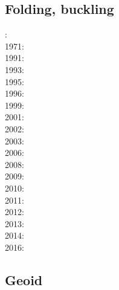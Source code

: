 \subsection{Folding, buckling} 

{\scriptsize
{}: \cite{ramb70}\\
1971: \cite{ramb71}\\
1991: \cite{flet91}\\
1993: \cite{zhhj93}\\
1995: \cite{flet95}\\
1996: \cite{zhho96}\\
1999: \cite{nagg99}\\
2001: \cite{scpo01}\\
2002: \cite{mumh02}\\
2003: \cite{nagv03}\\
2006: \cite{frsc06}\\
2008: \cite{schm08}\cite{manc08}\cite{scdk08}\\
2009: \cite{simp09}\\
2010: \cite{resb10}\\
2011: \cite{freh11}\\
2012: \cite{reds12}\cite{grsc12}\cite{scsc12}\\
2013: \cite{regc13}\\
2014: \cite{freh14}\cite{frex14}\\
2016: \cite{frsc16}
}

\subsection{Geoid}


